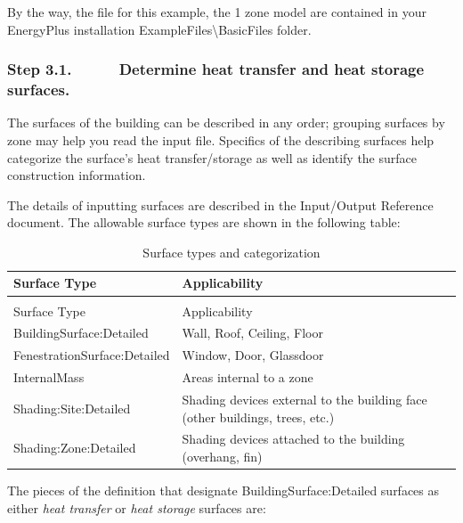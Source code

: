 By the way, the file for this example, the 1 zone model are contained in your EnergyPlus installation ExampleFiles\textbackslash{}BasicFiles folder.

\subsubsection{Step 3.1.~~~~~ Determine heat transfer and heat storage surfaces.}\label{step-3.1.-determine-heat-transfer-and-heat-storage-surfaces.}

The surfaces of the building can be described in any order; grouping surfaces by zone may help you read the input file. Specifics of the describing surfaces help categorize the surface's heat transfer/storage as well as identify the surface construction information.

The details of inputting surfaces are described in the Input/Output Reference document. The allowable surface types are shown in the following table:

\begin{longtable}[c]{p{1.91in}p{4.08in}}
\caption{Surface types and categorization \label{table:surface-types-and-categorization}} \tabularnewline
\toprule
Surface Type & Applicability \tabularnewline
\midrule
\endfirsthead

\caption[]{Surface types and categorization} \tabularnewline
\toprule
Surface Type & Applicability \tabularnewline
\midrule
\endhead

BuildingSurface:Detailed & Wall, Roof, Ceiling, Floor \tabularnewline
FenestrationSurface:Detailed & Window, Door, Glassdoor \tabularnewline
InternalMass & Areas internal to a zone \tabularnewline
Shading:Site:Detailed & Shading devices external to the building face (other buildings, trees, etc.) \tabularnewline
Shading:Zone:Detailed & Shading devices attached to the building (overhang, fin) \tabularnewline
\bottomrule
\end{longtable}

The pieces of the definition that designate BuildingSurface:Detailed surfaces as either \emph{heat transfer} or \emph{heat storage} surfaces are:

